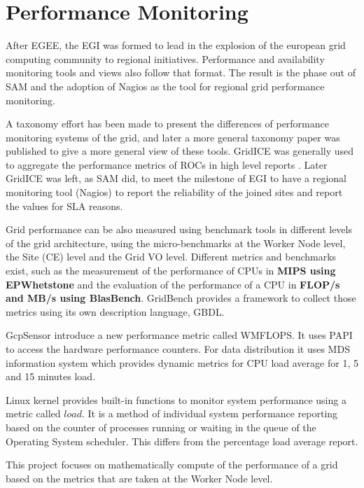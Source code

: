 \section{Performance Monitoring}
After \ac{EGEE}, the \ac{EGI} was formed to lead in the explosion of the european grid computing community to regional initiatives. Performance and availability monitoring tools and views also follow that format. The result is the phase out of \ac{SAM} \cite{egee3dsa122} and the adoption of Nagios as the tool for regional grid performance monitoring.

A taxonomy effort has been made \cite{gerndt2004performance} to present the differences of performance monitoring systems of the grid, and later a more general \cite{zanikolas2007importance} taxonomy paper was published to give a more general view of these tools. GridICE was generally used to aggregate the performance metrics of \acp{ROC} in high level reports \cite{andreozzi2005gridice}. Later GridICE was left, as \ac{SAM} did, to meet the milestone of \ac{EGI} to have a regional monitoring tool (Nagios) to report the reliability of the joined sites and report the values for \ac{SLA} reasons.

Grid performance can be also measured using benchmark tools in different levels of the grid architecture, using the micro-benchmarks at the Worker Node level, the Site (\ac{CE}) level and the Grid \ac{VO} level. Different metrics and benchmarks exist, such as the measurement of the performance of CPUs in {\bf MIPS using EPWhetstone} and the evaluation of the performance of a CPU in {\bf FLOP/s and MB/s using BlasBench}. GridBench \cite{gridbench} provides a framework to collect those metrics using its own description language, \ac{GBDL}.

GcpSensor \cite{gcpsensor} introduce a new performance metric called WMFLOPS. It uses \ac{PAPI} \cite{papi} to access the hardware performance counters. For data distribution it uses \ac{MDS} information system which provides dynamic metrics for CPU load average for 1, 5 and 15 minutes load.

Linux kernel provides built-in functions to monitor system performance using a metric called $load$. It is a method of individual system performance reporting based on the counter of processes running or waiting in the queue of the Operating System scheduler. This differs from the percentage load average report.

This project focuses on mathematically compute of the performance of a grid based on the metrics that are taken at the Worker Node level.

